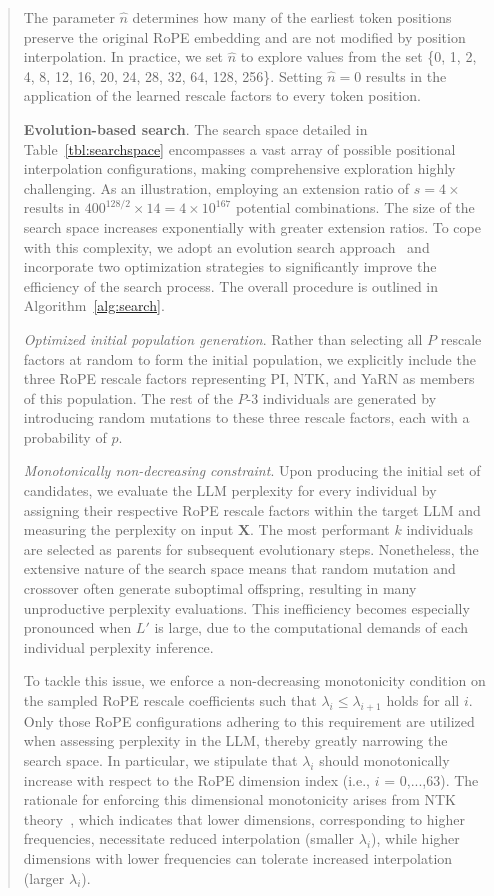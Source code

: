 \begin{abstract}
The parameter $\hat{n}$ determines how many of the earliest token positions preserve the original RoPE embedding and are not modified by position interpolation. In practice, we set $\hat{n}$ to explore values from the set \{0, 1, 2, 4, 8, 12, 16, 20, 24, 28, 32, 64, 128, 256\}. Setting $\hat{n}=0$ results in the application of the learned rescale factors to every token position.

\textbf{Evolution-based search}. The search space detailed in Table~\ref{tbl:searchspace} encompasses a vast array of possible positional interpolation configurations, making comprehensive exploration highly challenging. As an illustration, employing an extension ratio of $s=4\times$ results in $400^{128/2}\times14=4\times10^{167}$ potential combinations. The size of the search space increases exponentially with greater extension ratios. To cope with this complexity, we adopt an evolution search approach~\cite{guo2020single} and incorporate two optimization strategies to significantly improve the efficiency of the search process. The overall procedure is outlined in Algorithm~\ref{alg:search}.

\textit{Optimized initial population generation}. Rather than selecting all $P$ rescale factors at random to form the initial population, we explicitly include the three RoPE rescale factors representing PI, NTK, and YaRN as members of this population. The rest of the $P$-3 individuals are generated by introducing random mutations to these three rescale factors, each with a probability of $p$.

\textit{Monotonically non-decreasing constraint}. Upon producing the initial set of candidates, we evaluate the LLM perplexity for every individual by assigning their respective RoPE rescale factors within the target LLM and measuring the perplexity on input $\mathbf{X}$. The most performant $k$ individuals are selected as parents for subsequent evolutionary steps. Nonetheless, the extensive nature of the search space means that random mutation and crossover often generate suboptimal offspring, resulting in many unproductive perplexity evaluations. This inefficiency becomes especially pronounced when $L'$ is large, due to the computational demands of each individual perplexity inference.

To tackle this issue, we enforce a non-decreasing monotonicity condition on the sampled RoPE rescale coefficients such that $\lambda_i\le \lambda_{i+1}$ holds for all $i$. Only those RoPE configurations adhering to this requirement are utilized when assessing perplexity in the LLM, thereby greatly narrowing the search space. In particular, we stipulate that $\lambda_i$ should monotonically increase with respect to the RoPE dimension index (i.e., $i$ = 0,...,63). The rationale for enforcing this dimensional monotonicity arises from NTK theory~\cite{jacot2018neural,tancik2020fourier,ntk}, which indicates that lower dimensions, corresponding to higher frequencies, necessitate reduced interpolation (smaller $\lambda_i$), while higher dimensions with lower frequencies can tolerate increased interpolation (larger $\lambda_i$).


\end{abstract}
